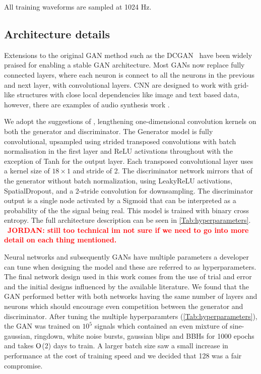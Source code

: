 \documentclass[12pt]{iopart}
\newcommand{\jordan}[1]{\textbf{\textcolor{red}{JORDAN: #1}}}
\newcommand{\chris}[1]{\textbf{\textcolor{green}{CHRIS: #1}}}
\begin{document}
All training waveforms are sampled at 1024 Hz.

\subsection{Architecture details}

%
Extensions to the original \ac{GAN} method such as the
\ac{DCGAN}~\cite{Radford2015} have been widely praised for
enabling a stable \ac{GAN} architecture. Most GANs now replace fully connected layers, where each neuron is connect to all the neurons in the previous and next layer, with convolutional layers. \ac{CNN} are designed to work with grid-like structures with close local dependencies like image and text based data, however, there are examples of audio synthesis work \cite{DBLP:journals/corr/abs-1809-11096}.

%
We adopt the suggestions of \cite{Radford2015,DBLP:journals/corr/abs-1809-11096}, lengthening
one-dimensional convolution kernels on both the generator and discriminator.
The Generator model is fully convolutional, upsampled using strided transposed
convolutions with batch normalisation in the first layer and ReLU activations
throughout with the exception of Tanh for the output layer. Each transposed
convolutional layer uses a kernel size of $18\times 1$ and stride of 2. The
discriminator network mirrors that of the generator without batch
normalization, using LeakyReLU activations, SpatialDropout, and a 2-stride
convolution for downsampling. The discriminator output is a single node activated by a Sigmoid that can be interpreted as
a probability of the the signal being real. This model is trained
with binary cross entropy. The full architecture description can be seen in \cref{Tab:hyperparameters}. ~\jordan{still too technical im not sure if we need to go into more detail on each thing mentioned.}

%
Neural networks and subsequently \acp{GAN} have multiple parameters a developer
can tune when designing the model and these are referred to as hyperparameters.
The final network design used in this work comes from the use of trial and
error and the initial designs influenced by the available literature. We found that the GAN performed better with both networks having the same number of layers and neurons which should encourage even competition between the generator and discriminator.  After
tuning the multiple hyperparamters (\cref{Tab:hyperparameters}), the GAN
was trained on $10^5$ signals which contained an even mixture of sine-gaussian, ringdown, white noise bursts, gaussian blips and BBHs for 1000 epochs and takes $\mathord{\mathrm{O}}$(2) days to train. A larger batch size saw a small increase in performance at the cost of training speed and we decided that 128 was a fair compromise. 
\end{document}
